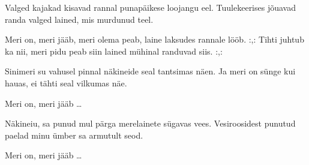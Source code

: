 Valged kajakad kisavad rannal
punap\"aikese loojangu eel.
Tuulekeerises j\~ouavad randa
valged lained, mis murdunud teel.

Meri on, meri j\"a\"ab, meri olema peab,
laine laksudes rannale l\"o\"ob.
:,: Tihti juhtub ka nii, meri pidu peab siin
lained m\"uhinal randuvad siis. :,:

Sinimeri su vahusel pinnal
n\"akineide seal tantsimas n\"aen.
Ja meri on s\"unge kui hauas,
ei t\"ahti seal vilkumas n\"ae.

Meri on, meri j\"a\"ab \ldots

N\"akineiu, sa punud mul p\"arga
merelainete s\"ugavas vees.
Vesiroosidest punutud paelad
minu \"umber sa armutult seod.

Meri on, meri j\"a\"ab \ldots